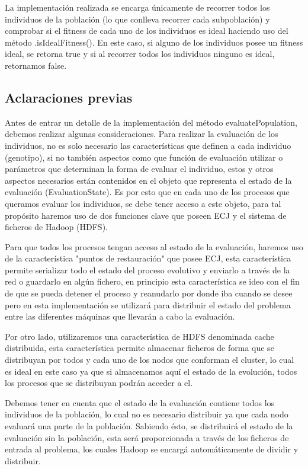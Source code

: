 La implementación realizada se encarga únicamente de recorrer todos los individuos de la población (lo que conlleva recorrer cada subpoblaci\'on) y comprobar si el fitness de cada uno de los individuos es ideal haciendo uso del método .isIdealFitness(). En este caso, si alguno de los individuos posee un fitness ideal, se retorna true y si al recorrer todos los individuos ninguno es ideal, retornamos false.

\subsection{Aclaraciones previas}

Antes de entrar un detalle de la implementación del método evaluatePopulation, debemos realizar algunas consideraciones. Para realizar la evaluación de los individuos, no es solo necesario las características que definen a cada individuo (genotipo), si no también aspectos como que función de evaluación utilizar o parámetros que determinan la forma de evaluar el individuo, estos y otros aspectos necesarios est\'an contenidos en el objeto que representa el estado de la evaluación (EvaluationState). Es por esto que en cada uno de los procesos que queramos evaluar los individuos, se debe tener acceso a este objeto, para tal propósito haremos uso de dos funciones clave que poseen ECJ y el sistema de ficheros de Hadoop (HDFS).

Para que todos los procesos tengan acceso al estado de la evaluación, haremos uso de la característica "puntos de restauración" que posee ECJ, esta característica permite serializar todo el estado del proceso evolutivo y enviarlo a través de la red o guardarlo en algún fichero, en principio esta característica se ideo con el fin de que se pueda detener el proceso y reanudarlo por donde iba cuando se desee pero en esta implementación se utilizar\'a para distribuir el estado del problema entre las diferentes m\'aquinas que llevar\'an a cabo la evaluación.

Por otro lado, utilizaremos una característica de HDFS denominada cache distribuida, esta característica permite almacenar ficheros de forma que se distribuyan por todos y cada uno de los nodos que conforman el cluster, lo cual es ideal en este caso ya que si almacenamos aquí el estado de la evolución, todos los procesos que se distribuyan podrán acceder a el.

Debemos tener en cuenta que el estado de la evaluación contiene todos los individuos de la población, lo cual no es necesario distribuir ya que cada nodo evaluar\'a una parte de la población. Sabiendo \'esto, se distribuirá el estado de la evaluación sin la población, esta ser\'a proporcionada a través de los ficheros de entrada al problema, los cuales Hadoop se encarg\'a automáticamente de dividir y distribuir.

